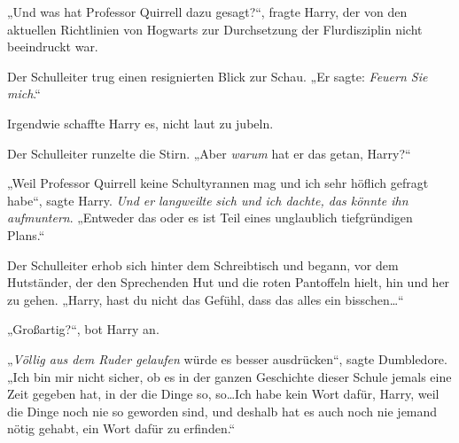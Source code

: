 „Und was hat Professor Quirrell dazu gesagt?“, fragte Harry, der von den aktuellen Richtlinien von Hogwarts zur Durchsetzung der Flurdisziplin nicht beeindruckt war.

Der Schulleiter trug einen resignierten Blick zur Schau.
„Er sagte: \emph{Feuern Sie mich}.“

Irgendwie schaffte Harry es, nicht laut zu jubeln.

Der Schulleiter runzelte die Stirn.
„Aber \emph{warum} hat er das getan, Harry?“

„Weil Professor Quirrell keine Schultyrannen mag und ich sehr höflich gefragt habe“, sagte Harry. \emph{Und er} \emph{langweilte} \emph{sich und ich dachte, das könnte ihn aufmuntern}.
„Entweder das oder es ist Teil eines unglaublich tiefgründigen Plans.“

Der Schulleiter erhob sich hinter dem Schreibtisch und begann, vor dem Hutständer, der den Sprechenden Hut und die roten Pantoffeln hielt, hin und her zu gehen.
„Harry, hast du nicht das Gefühl, dass das alles ein bisschen…“

„Großartig?“, bot Harry an.

„\emph{Völlig aus dem Ruder gelaufen} würde es besser ausdrücken“, sagte Dumbledore.
„Ich bin mir nicht sicher, ob es in der ganzen Geschichte dieser Schule jemals eine Zeit gegeben hat, in der die Dinge so, so…Ich habe kein Wort dafür, Harry, weil die Dinge noch nie so geworden sind, und deshalb hat es auch noch nie jemand nötig gehabt, ein Wort dafür zu erfinden.“

